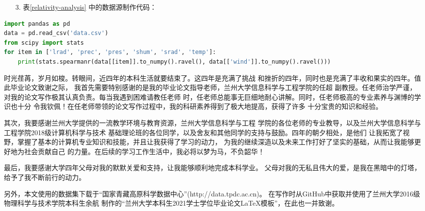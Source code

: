 \documentclass[AutoFakeBold]{LZUThesis}
\begin{document}
\begin{itemize}
\item[3. ] 表\ref{relativity-analysis} 中的数据源制作代码：
\end{itemize}

\begin{lstlisting}[language = python]
import pandas as pd
data = pd.read_csv('data.csv')
from scipy import stats
for item in ['lrad', 'prec', 'pres', 'shum', 'srad', 'temp']:
    print(stats.spearmanr(data[[item]].to_numpy().ravel(), data[['wind']].to_numpy().ravel()))
\end{lstlisting}
\Thanks

时光荏苒，岁月如梭。转眼间，近四年的本科生活就要结束了。这四年是充满了挑战
和挫折的四年，同时也是充满了丰收和果实的四年。值此毕业论文致谢之际，
我首先需要特别感谢的是我的毕业论文指导老师，兰州大学信息科学与工程学院的任超
副教授。任老师治学严谨，对我的论文写作极其认真负责。每当我遇到困难请教任老师
时，任老师总能事无巨细地耐心讲解。同时，任老师极高的专业素养与渊博的学识也十分
令我钦佩！在任老师带领的论文写作过程中，我的科研素养得到了极大地提高，获得了许多
十分宝贵的知识和经验。

其次，我要感谢兰州大学提供的一流教学环境与教育资源，兰州大学信息科学与工程
学院的各位老师的专业教导，以及兰州大学信息科学与工程学院2018级计算机科学与技术
基础理论班的各位同学，以及舍友和其他同学的支持与鼓励。四年的朝夕相处，是他们
让我拓宽了视野，掌握了基本的计算机专业知识和技能，并且让我获得了学习的动力，
为我的继续深造以及未来工作打好了坚实的基础，从而让我能够更好地为社会贡献自己
的力量。在后续的学习工作生活中，我必将以梦为马，不负韶华！

最后，我要感谢大学四年父母对我的默默关爱和支持，让我能够顺利地完成本科学业。
父母对我的无私且伟大的爱，是我在黑暗中的灯塔，给予了我不断前行的动力。

另外，本文使用的数据集下载于“国家青藏高原科学数据中心”(http://data.tpdc.ac.cn)。
在写作时从GitHub中获取并使用了兰州大学2016级物理科学与技术学院本科生余航
制作的“兰州大学本科生2021学士学位毕业论文LaTeX模板”，在此也一并致谢。
\end{document}
